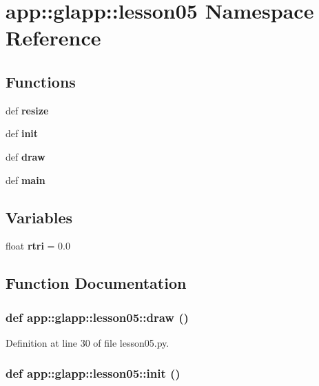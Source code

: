 \section{app::glapp::lesson05 Namespace Reference}
\label{namespaceapp_1_1glapp_1_1lesson05}


\subsection*{Functions}
\begin{CompactItemize}
\item 
def {\bf resize}
\item 
def {\bf init}
\item 
def {\bf draw}
\item 
def {\bf main}
\end{CompactItemize}
\subsection*{Variables}
\begin{CompactItemize}
\item 
float {\bf rtri} = 0.0
\end{CompactItemize}


\subsection{Function Documentation}
\subsubsection{\setlength{\rightskip}{0pt plus 5cm}def app::glapp::lesson05::draw ()}\label{namespaceapp_1_1glapp_1_1lesson05_e810b8cdf1497a6790e0f60d69b75bc0}




Definition at line 30 of file lesson05.py.
\subsubsection{\setlength{\rightskip}{0pt plus 5cm}def app::glapp::lesson05::init ()}\label{namespaceapp_1_1glapp_1_1lesson05_660773e2ddb0faa0922de08be5baf411}




